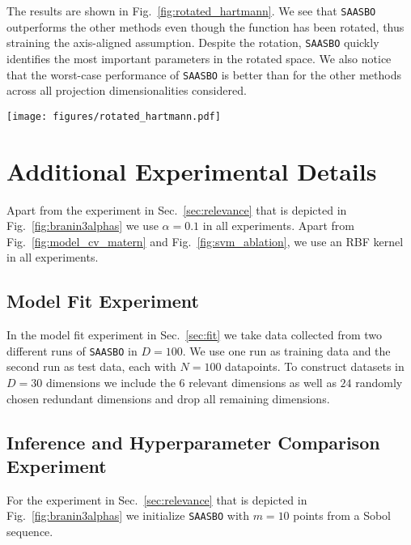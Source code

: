 \documentclass[accepted]{uai2021} %
\newcommand{\algoname}{{\texttt {SAASBO}}}
\begin{document}
The results are shown in Fig.~\ref{fig:rotated_hartmann}.
We see that \algoname{} outperforms the other methods even though the function has been rotated, thus straining the axis-aligned assumption.
Despite the rotation, \algoname{} quickly identifies the most important parameters in the rotated space.
We also notice that the worst-case performance of \algoname{} is better than for the other methods across all projection dimensionalities considered.

\begin{figure*}[!t]
  \centering
  \texttt{[image: figures/rotated\_hartmann.pdf]}
    \caption{
      We consider a rotated version of the Hartmann function with $d=6$.
      We generate random linear projection matrices $P_{d_p}$ for different projection dimensionalities $d_p \in \{ 6, 18, 30 \}$ and optimize the resulting rotated function.
      \algoname{} outperforms the other methods and is able to quickly identify the most important parameters in the rotated coordinate system.
    }
    \label{fig:rotated_hartmann}
\end{figure*}


\section{Additional Experimental Details}
\label{sec:expdetails}
Apart from the experiment in Sec.~\ref{sec:relevance} that is depicted
in Fig.~\ref{fig:branin3alphas} we use $\alpha=0.1$ in all experiments.
Apart from Fig.~\ref{fig:model_cv_matern} and Fig.~\ref{fig:svm_ablation}, we use an RBF kernel in all experiments.


\subsection{Model Fit Experiment}
In the model fit experiment in Sec.~\ref{sec:fit} we take data collected from two different runs of \algoname{} in $D=100$.
We use one run as training data and the second run as test data, each with $N=100$ datapoints.
To construct datasets in $D=30$ dimensions we include the $6$ relevant dimensions as well as $24$
randomly chosen redundant dimensions and drop all remaining dimensions.


\subsection{Inference and Hyperparameter Comparison Experiment}
For the experiment in Sec.~\ref{sec:relevance} that is depicted
in Fig.~\ref{fig:branin3alphas} we initialize \algoname{} with $m=10$
points from a Sobol sequence.
\end{document}
